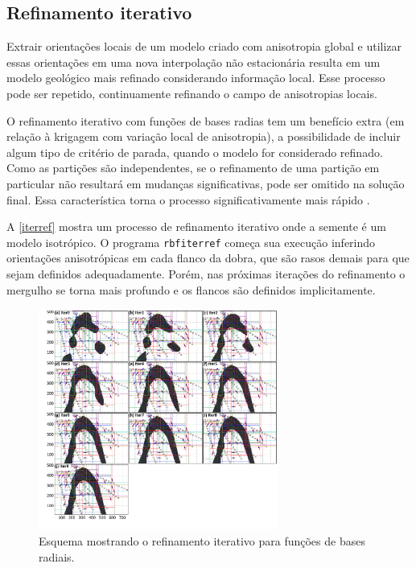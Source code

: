 \subsection{Refinamento iterativo}

Extrair orientações locais de um modelo criado com anisotropia global e utilizar essas orientações em uma nova interpolação não estacionária resulta em um modelo geológico mais refinado considerando informação local. Esse processo pode ser repetido, continuamente refinando o campo de anisotropias locais. 

O refinamento iterativo com funções de bases radias tem um benefício extra (em relação à krigagem com variação local de anisotropia), a possibilidade de incluir algum tipo de critério de parada, quando o modelo for considerado refinado. Como as partições são independentes, se o refinamento de uma partição em particular não resultará em mudanças significativas, pode ser omitido na solução final. Essa característica torna o processo significativamente mais rápido \cite{martin2017implicitmodeling}.

A \autoref{iterref} mostra um processo de refinamento iterativo onde a semente é um modelo isotrópico. O programa \verb|rbfiterref| começa sua execução inferindo orientações anisotrópicas em cada flanco da dobra, que são rasos demais para que sejam definidos adequadamente. Porém, nas próximas iterações do refinamento o mergulho se torna mais profundo e os flancos são definidos implicitamente.

\begin{figure}[!ht]
\caption{\label{iterref} Esquema mostrando o refinamento iterativo para funções de bases radiais.}
	\begin{center}
		\includegraphics[width=0.7\textwidth]{capitulo_2/iterref.jpg}
	\end{center}
\end{figure}

